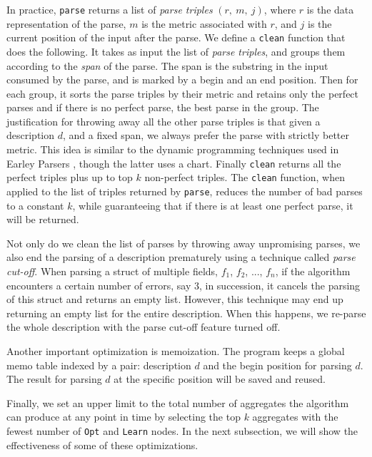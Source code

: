 In practice, {\tt parse} returns a list of
{\em parse triples} $(r,~m,~j)$, where $r$ is the data representation of
the parse, $m$ is the metric associated with $r$, and
$j$ is the current position of the input after the parse.
We define a {\tt clean} function that does the following.
It takes as input the list of {\em parse triples}, and groups
them according to the {\em span} of the parse. The span is
the substring in the input consumed by the parse,
and is marked by a begin and an end position.
Then for each group, it sorts the parse triples by
their metric and retains only the perfect parses and if there
is no perfect parse, the best parse in the group. 
The justification for throwing away all the other parse triples
is that given a description $d$, and a fixed span, we always
prefer the parse with strictly better metric. This idea is
similar to the dynamic programming techniques used in 
Earley Parsers \cite{earley-parser}, 
though the latter uses a chart. Finally {\tt clean} returns all
the perfect triples plus up to top $k$ non-perfect triples.
The {\tt clean} function, when applied to the list of triples
returned by {\tt parse},  reduces the number of bad parses 
to a constant $k$, while guaranteeing that if there is at least one
perfect parse, it will be returned. 

Not only do we clean the list of parses by throwing away
unpromising parses, we also end the parsing of a description
prematurely using a technique called {\em parse cut-off}.
When parsing a struct of multiple
fields, $f_1$, $f_2$, ..., $f_n$, if the algorithm encounters 
a certain number of errors, say 3, in succession, it cancels the
parsing of this struct and returns an empty list. However,
this technique may end up returning an empty list for
the entire description. When this happens, we re-parse the whole
description with the parse cut-off feature turned off. 

Another important optimization is memoization.
The program keeps a global memo table indexed by a pair:
description $d$ and the begin position for parsing $d$.
The result for parsing $d$ at the specific position
will be saved and reused. 

Finally, we set an upper limit to the total number of aggregates the
algorithm can produce at any point in time by selecting the top
$k$ aggregates with the fewest number of {\tt Opt} and {\tt Learn}
nodes. In the next subsection, we will show the effectiveness 
of some of these optimizations.

